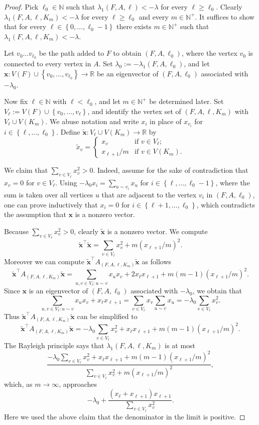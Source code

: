 \documentclass[11pt]{article}
\theoremstyle{definition}
\theoremstyle{remark}
\newcommand{\sset}[1]{\left\{{#1}\right\}}
\newcommand{\la}{\lambda}
\newcommand{\N}{\mathbb{N}}
\newcommand{\R}{\mathbb{R}}
\newcommand{\bx}{\bm{x}}
\newcommand{\tx}{\tilde{x}}
\newcommand{\tbx}{\tilde{\bx}}
\begin{document}
\begin{proof}
    Pick $\ell_0 \in \N$ such that $\la_1(F, A, \ell) < -\la$ for every $\ell \ge \ell_0$. Clearly $\la_1(F, A, \ell, K_m) < -\la$ for every $\ell \ge \ell_0$ and every $m \in \N^+$. It suffices to show that for every $\ell \in \sset{0, \dots, \ell_0 - 1}$ there exists $m \in \N^+$ such that $\la_1(F, A, \ell, K_m) < -\la$.
    
    Let $v_0 \dots v_{\ell_0}$ be the path added to $F$ to obtain $(F, A, \ell_0)$, where the vertex $v_0$ is connected to every vertex in $A$. Set $\la_0 := -\la_1(F, A, \ell_0)$, and let $\bx \colon V(F) \cup \sset{v_0, \dots, v_{\ell_0}} \to \R$ be an eigenvector of $(F, A, \ell_0)$ associated with $-\la_0$.

    Now fix $\ell \in \N$ with $\ell < \ell_0$, and let $m \in \N^+$ be determined later. Set $V_\ell := V(F) \cup \sset{v_0, \dots, v_\ell}$, and identify the vertex set of $(F, A, \ell, K_m)$ with $V_\ell \cup V(K_m)$. We abuse notation and write $x_i$ in place of $x_{v_i}$ for $i \in \sset{\ell, \dots, \ell_0}$. Define $\tbx\colon V_\ell \cup V(K_m) \to \R$ by
    \[
        \tx_v = \begin{cases}
            x_v & \text{if }v \in V_\ell; \\
            x_{\ell+1}/m & \text{if }v \in V(K_m).
        \end{cases}
    \]
    
    We claim that $\sum_{v \in V_\ell}x_v^2 > 0$. Indeed, assume for the sake of contradiction that $x_v = 0$ for $v \in V_\ell$. Using $-\la_0x_i = \sum_{u\sim v_i}x_u$ for $i \in \sset{\ell, \dots, \ell_0-1}$, where the sum is taken over all vertices $u$ that are adjacent to the vertex $v_i$ in $(F, A, \ell_0)$, one can prove inductively that $x_i = 0$ for $i \in \sset{\ell + 1, \dots, \ell_0}$, which contradicts the assumption that $\bx$ is a nonzero vector.
    
    Because $\sum_{v \in V_\ell} x_v^2 > 0$, clearly $\tbx$ is a nonzero vector. We compute
    \[
        \tbx^\intercal \tbx = \sum_{v \in V_\ell}x_v^2 + m(x_{\ell + 1}/m)^2.
    \]
    Moreover we can compute $\tbx^\intercal A_{(F, A, \ell, K_m)} \tbx$ as follows
    \[
        \tbx^\intercal A_{(F, A, \ell, K_m)} \tbx = \sum_{u, v \in V_\ell\colon u \sim v} x_ux_v + 2x_\ell x_{\ell+1} + m(m-1)(x_{\ell+1}/m)^2.
    \]
    Since $\bx$ is an eigenvector of $(F, A, \ell_0)$ associated with $-\la_0$, we obtain that
    \[
        \sum_{u, v \in V_\ell\colon u \sim v} x_ux_v + x_\ell x_{\ell + 1} = \sum_{v \in V_\ell}x_v\sum_{u \sim v}x_u = -\la_0 \sum_{v \in V_\ell}x_v^2.
    \]
    Thus $\tbx^\intercal A_{(F, A, \ell, K_m)} \tbx$ can be simplified to
    \[
        \tbx^\intercal A_{(F, A, \ell, K_m)} \tbx = -\la_0 \sum_{v \in V_\ell}x_v^2 + x_\ell x_{\ell+1} + m(m-1)(x_{\ell+1}/m)^2.
    \]
    The Rayleigh principle says that $\la_1(F, A, \ell, K_m)$ is at most
    \[
        \frac{-\la_0 \sum_{v \in V_\ell} x_v^2 + x_\ell x_{\ell+1} + m(m-1)(x_{\ell+1}/m)^2}{\sum_{v \in V_\ell}x_v^2 + m(x_{\ell + 1}/m)^2},
    \]
    which, as $m \to \infty$, approaches
    \[
        -\la_0 + \frac{(x_\ell + x_{\ell+1})x_{\ell+1}}{\sum_{v \in V_\ell}x_v^2}.
    \]
    Here we used the above claim that the denominator in the limit is positive.
    

\end{proof}
\end{document}
